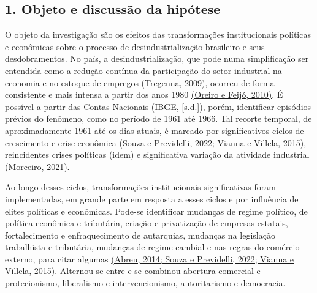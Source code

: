 \subsection{\texorpdfstring{\textbf{1. Objeto e discussão da
hipótese}}{1. Objeto e discussão da hipótese}}\label{objeto-e-discussuxe3o-da-hipuxf3tese}

O objeto da investigação são os efeitos das transformações
institucionais políticas e econômicas sobre o processo de
desindustrialização brasileiro e seus desdobramentos. No país, a
desindustrialização, que pode numa simplificação ser entendida como a
redução contínua da participação do setor industrial na economia e no
estoque de empregos
\href{https://www.zotero.org/google-docs/?kiAalY}{(Tregenna, 2009)},
ocorreu de forma consistente e mais intensa a partir dos anos 1980
\href{https://www.zotero.org/google-docs/?B3wCNB}{(Oreiro e Feijó,
2010)}. É possível a partir das Contas Nacionais
\href{https://www.zotero.org/google-docs/?kIvHAO}{(IBGE, {[}s.d.{]})},
porém, identificar episódios prévios do fenômeno, como no período de
1961 até 1966. Tal recorte temporal, de aproximadamente 1961 até os dias
atuais, é marcado por significativos ciclos de crescimento e crise
econômica \href{https://www.zotero.org/google-docs/?LxtZo0}{(Souza e
Previdelli, 2022; Vianna e Villela, 2015)}, reincidentes crises
políticas (idem) e significativa variação da atividade industrial
\href{https://www.zotero.org/google-docs/?r3fjx6}{(Morceiro, 2021)}.

Ao longo desses ciclos, transformações institucionais significativas
foram implementadas, em grande parte em resposta a esses ciclos e por
influência de elites políticas e econômicas. Pode-se identificar
mudanças de regime político, de política econômica e tributária, criação
e privatização de empresas estatais, fortalecimento e enfraquecimento de
autarquias, mudanças na legislação trabalhista e tributária, mudanças de
regime cambial e nas regras do comércio externo, para citar algumas
\href{https://www.zotero.org/google-docs/?GdUIm4}{(Abreu, 2014; Souza e
Previdelli, 2022; Vianna e Villela, 2015)}. Alternou-se entre e se
combinou abertura comercial e protecionismo, liberalismo e
intervencionismo, autoritarismo e democracia.


